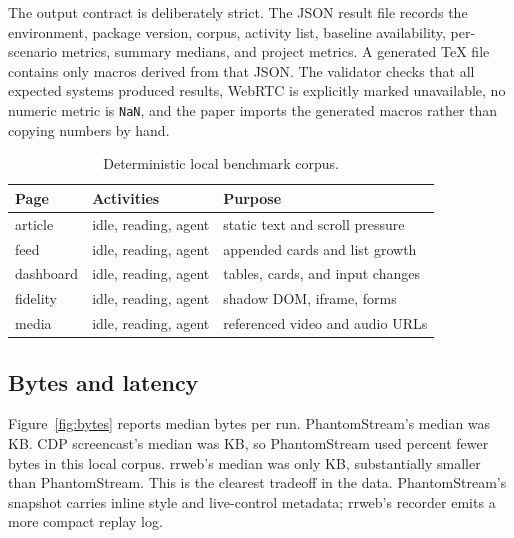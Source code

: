 \documentclass[conference]{IEEEtran}
\newcommand{\code}[1]{\texttt{\small #1}}
\begin{document}
The output contract is deliberately strict. The JSON result file records the
environment, package version, corpus, activity list, baseline availability,
per-scenario metrics, summary medians, and project metrics. A generated TeX file
contains only macros derived from that JSON. The validator checks that all
expected systems produced results, WebRTC is explicitly marked unavailable, no
numeric metric is \code{NaN}, and the paper imports the generated macros rather
than copying numbers by hand.

\begin{table}[t]
\centering
\caption{Deterministic local benchmark corpus.}
\label{tab:corpus}
\footnotesize
\begin{tabular}{@{}l l p{}@{}}
\toprule
Page & Activities & Purpose \\
\midrule
article & idle, reading, agent & static text and scroll pressure \\
feed & idle, reading, agent & appended cards and list growth \\
dashboard & idle, reading, agent & tables, cards, and input changes \\
fidelity & idle, reading, agent & shadow DOM, iframe, forms \\
media & idle, reading, agent & referenced video and audio URLs \\
\bottomrule
\end{tabular}
\end{table}

\subsection{Bytes and latency}

Figure~\ref{fig:bytes} reports median bytes per run. PhantomStream's median was
\PSPhantomMedianKB{} KB. CDP screencast's median was \PSCDPMedianKB{} KB, so
PhantomStream used \PSReductionVsCDP{} percent fewer bytes in this local corpus.
rrweb's median was only \PSRrwebMedianKB{} KB, substantially smaller than
PhantomStream. This is the clearest tradeoff in the data. PhantomStream's
snapshot carries inline style and live-control metadata; rrweb's recorder emits a
more compact replay log.
\end{document}
